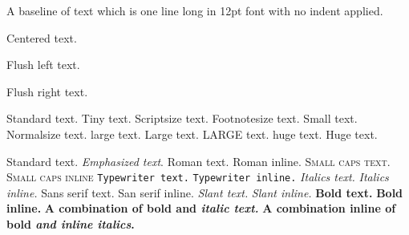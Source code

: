 

\noindent
A baseline of text which is one line long in 12pt font with no indent applied.

\begin{center}
Centered text.
\end{center}

\begin{flushleft}
Flush left text.
\end{flushleft}

\begin{flushright}
Flush right text.
\end{flushright}

Standard text. { Tiny text.} { Scriptsize text.} { Footnotesize text.} { Small text.} {\normalsize Normalsize text.} {\large large text.} {\Large Large text.} {\LARGE LARGE text.} {\huge huge text.} {\Huge Huge text.}

Standard text. \emph{Emphasized text}. \textrm{Roman text.} \textrm{Roman inline.} \textsc{Small caps text.} \textsc{Small caps inline} \texttt{Typewriter text.} \texttt{Typewriter inline.} \textit{Italics text.} \textit{Italics inline.} \textsf{Sans serif text.} \textsf{San serif inline.} \textsl{Slant text.} \textsl{Slant inline.}  \textbf{Bold text.} \textbf{Bold inline.} \textbf{A combination of bold and \textit{italic text.}} \textbf{A combination inline of bold \textit{and inline italics}.}

